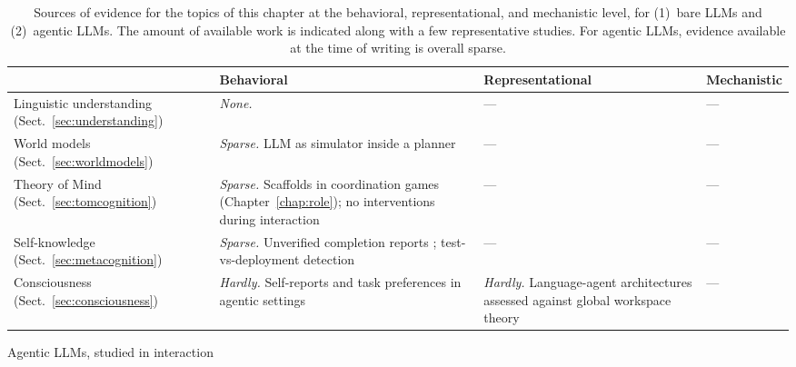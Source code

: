 \begin{table}
\bigskip

\begin{subtable}{\textwidth}
\begin{tabularx}{\linewidth}{@{}p{2.1cm}XXX@{}}
\toprule
 & \textbf{Behavioral} & \textbf{Representational} & \textbf{Mechanistic} \\
\midrule
Linguistic understanding (Sect.~\ref{sec:understanding}) &
\emph{None.} &
--- &
--- \\
\addlinespace
World models (Sect.~\ref{sec:worldmodels}) &
\emph{Sparse.} LLM as simulator inside a planner \citep{hao2023reasoning,gu2024your} &
--- &
--- \\
\addlinespace
Theory of Mind (Sect.~\ref{sec:tomcognition}) &
\emph{Sparse.} Scaffolds in coordination games (Chapter~\ref{chap:role}); no interventions during interaction &
--- &
--- \\
\addlinespace
Self-knowledge (Sect.~\ref{sec:metacognition}) &
\emph{Sparse.} Unverified completion reports \citep{shapira2026agentschaos}; test-vs-deployment detection \citep{needham2025large} &
--- &
--- \\
\addlinespace
Consciousness (Sect.~\ref{sec:consciousness}) &
\emph{Hardly.} Self-reports and task preferences in agentic settings \citep{gray2025agentic} &
\emph{Hardly.} Language-agent architectures assessed against global workspace theory \citep{goldstein2024case} &
--- \\
\bottomrule
\end{tabularx}
\caption{Agentic LLMs, studied in interaction}\label{tab:levels-agentic}
\end{subtable}

\caption{Sources of evidence for the topics of this chapter at the behavioral, representational, and mechanistic level, for (1)~bare LLMs and (2)~agentic LLMs. The amount of available work is indicated along with a few representative studies. For agentic LLMs, evidence available at the time of writing is overall sparse.}\label{tab:levels}
\end{table}
 
